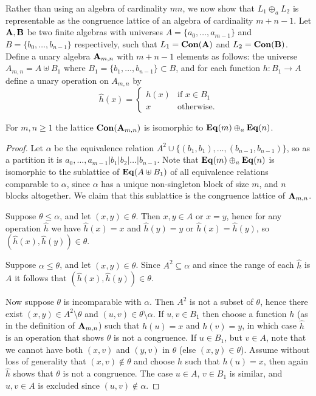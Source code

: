 
Rather than using an algebra of cardinality $mn$,
we now show that $L_1\oplus_aL_2$ is representable as the congruence 
lattice of an algebra of cardinality $m+n-1$.
Let $\mathbf{A},\mathbf{B}$ be two finite algebras with universes $A=\{a_0,\dots,a_{m-1}\}$ and 
$B=\{b_0,\dots,b_{n-1}\}$ respectively,
such that $L_1=\mathbf{Con}(\mathbf{A})$ and $L_2=\mathbf{Con}(\mathbf{B})$. 
Define a unary algebra $\mathbf{A}_{m,n}$ with $m+n-1$ elements as follows: 
the universe $A_{m,n}=A\uplus B_1$ where
$B_1=\{b_1,\dots,b_{n-1}\}\subset B$, and for each function $h:B_1\to A$ 
define a unary operation on $A_{m,n}$ by
$$\hat h(x)=\begin{cases}h(x)&\text{if $x\in B_1$}\\ 
x&\text{otherwise.}\end{cases}$$

\begin{lemma}
  For $m,n\ge 1$ the lattice $\mathbf{Con}(\mathbf{A}_{m,n})$ is isomorphic to
  $\mathbf{Eq}(m)\oplus_a \mathbf{Eq}(n)$. 
\end{lemma}
\begin{proof}
  Let $\alpha$ be the equivalence relation
  $A^2\cup\{(b_1,b_1),\dots,(b_{n-1},b_{n-1})\}$, so as a partition it is  
  $a_0,\dots,a_{m-1}|b_1|b_2|\dots|b_{n-1}$. 
  Note that $\mathbf{Eq}(m)\oplus_a \mathbf{Eq}(n)$ is isomorphic to the sublattice
  of $\mathbf{Eq}(A\uplus B_1)$ of all equivalence relations comparable to $\alpha$, since
  $\alpha$ has a unique non-singleton block of size $m$, and $n$ blocks
  altogether. We claim that this sublattice is the congruence lattice of $\mathbf{A}_{m,n}$.  

  Suppose $\theta\le\alpha$, and let $(x,y)\in\theta$. Then $x,y\in A$ or $x=y$,
  hence for any operation $\hat h$ we  have $\hat h(x)=x$ and $\hat h(y)=y$ or
  $\hat h(x)=\hat h(y)$, so $(\hat h(x),\hat h(y))\in\theta$. 

  Suppose $\alpha\le\theta$, and let $(x,y)\in\theta$. Since $A^2\subseteq\alpha$
  and since the range of each $\hat h$ is $A$ it follows that 
  $(\hat h(x),\hat h(y))\in\theta$. 

  Now suppose $\theta$ is incomparable with $\alpha$. Then $A^2$ is not a subset
  of $\theta$, hence there exist $(x,y)\in A^2\setminus\theta$ and
  $(u,v)\in\theta\setminus\alpha$. If $u,v\in B_1$ then choose a function $h$ (as
  in the definition of $\mathbf{A}_{m,n}$) such that $h(u)=x$ and $h(v)=y$, in which
  case $\hat h$ is an operation that shows $\theta$ is not a congruence. 
  If $u\in B_1$, but $v\in A$, note that we cannot have both $(x,v)$ and $(y,v)$
  in $\theta$ (else $(x,y)\in\theta$). Assume without loss of generality 
  that $(x,v)\notin\theta$ and choose $h$ such that $h(u)=x$, then again $\hat h$
  shows that $\theta$ is not a congruence. 
  The case $u\in A$, $v\in B_1$ is similar, and $u,v\in A$ is excluded since
  $(u,v)\notin\alpha$. 
\end{proof}

